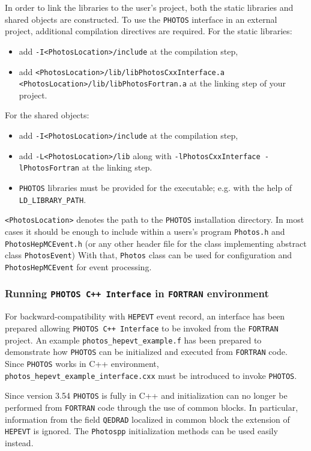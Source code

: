 \documentclass[]{Photos_interface_design}
\begin{document}
In order to link the libraries to the user's project, both the static libraries and shared objects are
constructed. To use the {\tt PHOTOS} interface in an external project, additional 
compilation directives are required. For the static libraries:
\begin{itemize}
  \item add {\tt -I<PhotosLocation>/include} at the compilation step,
  \item add {\tt <PhotosLocation>/lib/libPhotosCxxInterface.a <PhotosLocation>/lib/libPhotosFortran.a} at the linking step of your project.
\end{itemize}
For the shared objects:
\begin{itemize}
  \item add {\tt -I<PhotosLocation>/include} at the compilation step,
  \item add {\tt -L<PhotosLocation>/lib} along with {\tt -lPhotosCxxInterface -lPhotosFortran} at the linking step.
  \item  {\tt PHOTOS} libraries must be provided for the executable; e.g. with the help of {\tt LD\_LIBRARY\_PATH}.
\end{itemize}
{\tt <PhotosLocation>} denotes the path to the {\tt PHOTOS} installation directory.
In most cases it should be enough to include within a users's program {\tt Photos.h} and {\tt PhotosHepMCEvent.h} (or any other header file for the class implementing abstract class {\tt PhotosEvent})
With that, {\tt Photos} class can be used for configuration and {\tt PhotosHepMCEvent}
for event processing.

\subsubsection{Running {\tt PHOTOS C++ Interface} in {\tt FORTRAN} environment}

For backward-compatibility with {\tt HEPEVT} event record, an interface has been prepared
allowing {\tt PHOTOS C++ Interface} to be invoked from the {\tt FORTRAN} project. An example
{\tt photos\_hepevt\_example.f} has been prepared to demonstrate how {\tt PHOTOS} can be
initialized and executed from {\tt FORTRAN} code. Since {\tt PHOTOS} works in C++ environment,
{\tt photos\_hepevt\_example\_interface.cxx} must be introduced to invoke {\tt PHOTOS}.

Since version 3.54 {\tt PHOTOS} is fully in C++ and initialization can no longer
be performed from {\tt FORTRAN} code through the use of common blocks. 
In particular, information from the field 
{\tt QEDRAD} localized in common block 
{\tt } the extension of {\tt HEPEVT} is ignored. 
The  {\tt Photospp} initialization methods can be used easily instead.
\end{document}

